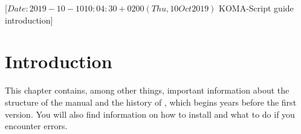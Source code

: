 %
%
%
%
%
%
%
%
% 
%
%
%
%

                 [$Date: 2019-10-10 10:04:30 +0200 (Thu, 10 Oct 2019) $
                  KOMA-Script guide introduction]


\chapter{Introduction}

This chapter contains, among other things, important information about the 
structure of the manual and the history of {\KOMAScript}, which begins 
years before the first version. You will also find information on how to
install {\KOMAScript} and what to do if you encounter errors.

